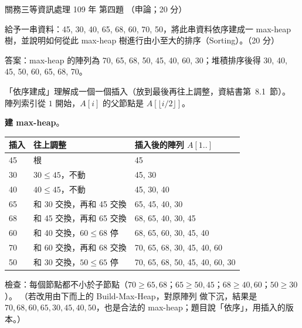 \begin{pastexam}[label={px:gw3-109-ds-04}]{關務三等資訊處理 109 年 第四題}
（申論；20 分）

給予一串資料：45, 30, 40, 65, 68, 60, 70, 50，將此串資料依序建成一 max-heap 樹，並說明如何從此 max-heap 樹進行由小至大的排序（Sorting）。（20 分）
\end{pastexam}

\begin{pastsoln}
答案：max-heap 的陣列為 70, 65, 68, 50, 45, 40, 60, 30；堆積排序後得 30, 40, 45, 50, 60, 65, 68, 70。

「依序建成」理解成一個一個插入（放到最後再往上調整，資結書第~8.1~節）。 陣列索引從 $1$ 開始，$A[i]$ 的父節點是 $A[\lfloor i/2 \rfloor]$。

\textbf{建 max-heap}。
\begin{center}
\small
\begin{tabular}{lll}
\toprule
插入 & 往上調整 & 插入後的陣列 $A[1..]$ \\
\midrule
45 & 根 & 45 \\
30 & $30 \le 45$，不動 & 45, 30 \\
40 & $40 \le 45$，不動 & 45, 30, 40 \\
65 & 和 30 交換，再和 45 交換 & 65, 45, 40, 30 \\
68 & 和 45 交換，再和 65 交換 & 68, 65, 40, 30, 45 \\
60 & 和 40 交換，$60 \le 68$ 停 & 68, 65, 60, 30, 45, 40 \\
70 & 和 60 交換，再和 68 交換 & 70, 65, 68, 30, 45, 40, 60 \\
50 & 和 30 交換，$50 \le 65$ 停 & 70, 65, 68, 50, 45, 40, 60, 30 \\
\bottomrule
\end{tabular}
\end{center}
\begin{center}
\end{center}
檢查：每個節點都不小於子節點（$70 \ge 65, 68$；$65 \ge 50, 45$；$68 \ge 40, 60$；$50 \ge 30$）。 （若改用由下而上的 Build-Max-Heap，對原陣列
做下沉，結果是 $70, 68, 60, 65, 30, 45, 40, 50$，也是合法的 max-heap；題目說「依序」，用插入的版本。）


\end{pastsoln}
